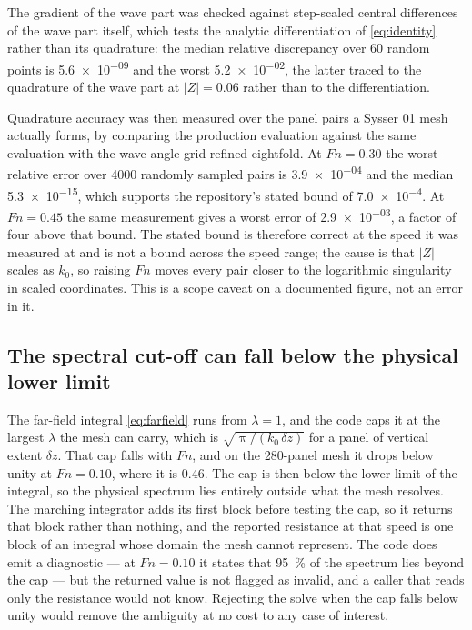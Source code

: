 \documentclass[11pt]{article}
\newcommand{\Fn}{\mathit{Fn}}
\begin{document}
The gradient of the wave part was checked against step-scaled central differences of the
wave part itself, which tests the analytic differentiation of \eqref{eq:identity} rather
than its quadrature: the median relative discrepancy over 60 random points is \num{5.6e-09} and
the worst \num{5.2e-02}, the latter traced to the quadrature of the wave part at
$|Z| = \num{0.06}$ rather than to the differentiation.

Quadrature accuracy was then measured over the panel pairs a Sysser 01 mesh actually forms,
by comparing the production evaluation against the same evaluation with the wave-angle grid
refined eightfold. At $\Fn = 0.30$ the worst relative error over 4000 randomly sampled
pairs is \num{3.9e-04} and the median \num{5.3e-15}, which supports the repository's stated bound of
\num{7.0e-4}. At $\Fn = 0.45$ the same measurement gives a worst error of \num{2.9e-03}, a factor
of four above that bound. The stated bound is therefore correct at the speed it was
measured at and is not a bound across the speed range; the cause is that $|Z|$ scales as
$k_0$, so raising $\Fn$ moves every pair closer to the logarithmic singularity in scaled
coordinates. This is a scope caveat on a documented figure, not an error in it.

\subsection{The spectral cut-off can fall below the physical lower limit}

The far-field integral \eqref{eq:farfield} runs from $\lambda = 1$, and the code caps it at
the largest $\lambda$ the mesh can carry, which is $\sqrt{\uppi/(k_0\,\delta z)}$ for a
panel of vertical extent $\delta z$. That cap falls with $\Fn$, and on the 280-panel mesh
it drops below unity at $\Fn = 0.10$, where it is 0.46. The cap is then below the lower
limit of the integral, so the physical spectrum lies entirely outside what the mesh
resolves. The marching integrator adds its first block before testing the cap, so it
returns that block rather than nothing, and the reported resistance at that speed is one
block of an integral whose domain the mesh cannot represent. The code does emit a
diagnostic --- at $\Fn = 0.10$ it states that \SI{95}{\percent} of the spectrum lies beyond
the cap --- but the returned value is not flagged as invalid, and a caller that reads only
the resistance would not know. Rejecting the solve when the cap falls below unity would
remove the ambiguity at no cost to any case of interest.
\end{document}
